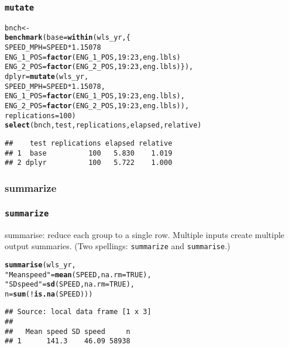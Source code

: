 \documentclass{beamer}\usepackage[]{graphicx}\usepackage[]{color}
\makeatletter
\newcommand{\hlnum}[1]{\textcolor[rgb]{0.686,0.059,0.569}{#1}}%
\newcommand{\hlstr}[1]{\textcolor[rgb]{0.192,0.494,0.8}{#1}}%
\newcommand{\hlopt}[1]{\textcolor[rgb]{0,0,0}{#1}}%
\newcommand{\hlstd}[1]{\textcolor[rgb]{0.345,0.345,0.345}{#1}}%
\newcommand{\hlkwb}[1]{\textcolor[rgb]{0.69,0.353,0.396}{#1}}%
\newcommand{\hlkwc}[1]{\textcolor[rgb]{0.333,0.667,0.333}{#1}}%
\newcommand{\hlkwd}[1]{\textcolor[rgb]{0.737,0.353,0.396}{\textbf{#1}}}%
\newenvironment{kframe}{%
 \def\at@end@of@kframe{}%
 \ifinner\ifhmode%
  \def\at@end@of@kframe{\end{minipage}}%
  \begin{minipage}{\columnwidth}%
 \fi\fi%
 \def\FrameCommand##1{\hskip\@totalleftmargin \hskip-\fboxsep
 \colorbox{shadecolor}{##1}\hskip-\fboxsep
     \hskip-\linewidth \hskip-\@totalleftmargin \hskip\columnwidth}%
 \MakeFramed {\advance\hsize-\width
   \@totalleftmargin\z@ \linewidth\hsize
   \@setminipage}}%
 {\par\unskip\endMakeFramed%
 \at@end@of@kframe}
\newenvironment{knitrout}{}{} %
\makeatother
\begin{document}
\begin{frame}[fragile]
  \frametitle{{\tt mutate}}
\begin{knitrout}\footnotesize
{}\color{fgcolor}\begin{kframe}
\begin{alltt}
\hlstd{bnch} \hlkwb{<-}
\hlkwd{benchmark}\hlstd{(}\hlkwc{base} \hlstd{=} \hlkwd{within}\hlstd{(wls_yr, \{}
                        \hlstd{SPEED_MPH} \hlkwb{=} \hlstd{SPEED} \hlopt{*} \hlnum{1.15078}
                        \hlstd{ENG_1_POS} \hlkwb{=} \hlkwd{factor}\hlstd{(ENG_1_POS,} \hlnum{19}\hlopt{:}\hlnum{23}\hlstd{, eng.lbls)}
                        \hlstd{ENG_2_POS} \hlkwb{=} \hlkwd{factor}\hlstd{(ENG_2_POS,} \hlnum{19}\hlopt{:}\hlnum{23}\hlstd{, eng.lbls)\}),}
          \hlkwc{dplyr} \hlstd{=} \hlkwd{mutate}\hlstd{(wls_yr,}
                         \hlkwc{SPEED_MPH} \hlstd{= SPEED} \hlopt{*} \hlnum{1.15078}\hlstd{,}
                         \hlkwc{ENG_1_POS} \hlstd{=} \hlkwd{factor}\hlstd{(ENG_1_POS,} \hlnum{19}\hlopt{:}\hlnum{23}\hlstd{, eng.lbls),}
                         \hlkwc{ENG_2_POS} \hlstd{=} \hlkwd{factor}\hlstd{(ENG_2_POS,} \hlnum{19}\hlopt{:}\hlnum{23}\hlstd{, eng.lbls)),}
          \hlkwc{replications} \hlstd{=} \hlnum{100}\hlstd{)}
\hlkwd{select}\hlstd{(bnch, test, replications, elapsed, relative)}
\end{alltt}
\begin{verbatim}
##    test replications elapsed relative
## 1  base          100   5.830    1.019
## 2 dplyr          100   5.722    1.000
\end{verbatim}
\end{kframe}
\end{knitrout}
\end{frame} 

\subsubsection{summarize}%
\begin{frame}[fragile]
  \frametitle{{\tt summarize}}
summarise: reduce each group to a single row. Multiple
inputs create multiple output summaries.  (Two spellings:
{\tt summarize} and {\tt summarise}.)
\begin{knitrout}\footnotesize
{}\color{fgcolor}\begin{kframe}
\begin{alltt}
\hlkwd{summarise}\hlstd{(wls_yr,}
          \hlstr{"Mean speed"} \hlstd{=} \hlkwd{mean}\hlstd{(SPEED,} \hlkwc{na.rm} \hlstd{=} \hlnum{TRUE}\hlstd{),}
          \hlstr{"SD speed"}   \hlstd{=} \hlkwd{sd}\hlstd{(SPEED,} \hlkwc{na.rm} \hlstd{=} \hlnum{TRUE}\hlstd{),}
          \hlkwc{n}            \hlstd{=} \hlkwd{sum}\hlstd{(}\hlopt{!}\hlkwd{is.na}\hlstd{(SPEED)))}
\end{alltt}
\begin{verbatim}
## Source: local data frame [1 x 3]
## 
##   Mean speed SD speed     n
## 1      141.3    46.09 58938
\end{verbatim}
\end{kframe}
\end{knitrout}
\end{frame} 
\end{document}
